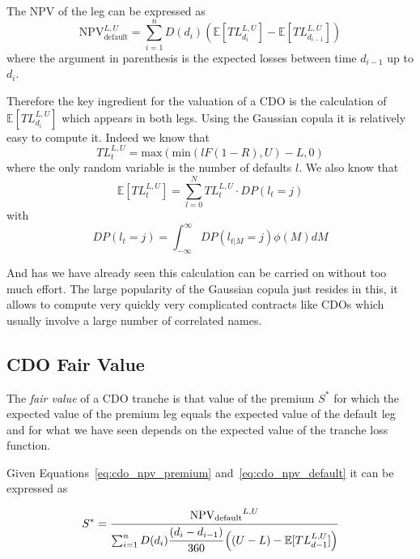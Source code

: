The NPV of the leg can be expressed as
\begin{equation}
\mathrm{NPV}_{\mathrm{default}}^{L,U}=\sum_{i=1}^{n}D(d_i)\left(\mathbb{E}[TL_{d_i}^{L,U}]-\mathbb{E}[TL_{d_{i-1}}^{L,U}]\right)
\label{eq:cdo_npv_default}
\end{equation}
where the argument in parenthesis is the expected losses between time $d_{i-1}$ up to $d_i$. 

Therefore the key ingredient for the valuation of a CDO is the calculation of $\mathbb{E}[TL_{d_i}^{L,U}]$ which appears in both legs.
Using the Gaussian copula it is relatively easy to compute it. 
Indeed we know that 
\begin{equation}
TL_{t}^{L,U}=\mathrm{max}(\mathrm{min}(lF(1-R), U)-L, 0)
\label{eq:tl}
\end{equation}
where the only random variable is the number of defaults $l$. We also know that 
\begin{equation}
\mathbb{E}[TL_{t}^{L,U}] = \sum_{l=0}^{N}TL_{t}^{L,U}\cdot DP(l_t=j)
\label{eq:etl}
\end{equation}
with 
\begin{equation}
DP(l_t=j)=\int_{-\infty}^{\infty} DP(l_{t|M}=j) \phi(M)dM
\label{eq:dp_int}
\end{equation}

And has we have already seen this calculation can be carried on without too much effort.
The large popularity of the Gaussian copula just resides in this, it allows to compute very quickly very complicated contracts like CDOs which usually involve a large number of correlated names.

\subsection{CDO Fair Value}
The \emph{fair value} of a CDO tranche is that value of the premium $S^*$ for which the expected value of the premium leg equals the expected value of the default leg and for what we have seen depends on the expected value of the tranche loss function.

Given Equations~\ref{eq:cdo_npv_premium} and~\ref{eq:cdo_npv_default} it can be expressed as

\begin{equation}
S^* = \cfrac{\mathrm{NPV_{default}}^{L,U}}{\sum^{n}_{i=1}D(d_i)\cfrac{(d_i - d_{i-1})}{360}\left((U-L)-\mathbb{E}[TL_{d-1}^{L,U}]\right)}
\label{eq:cdo_fair_value}
\end{equation}

